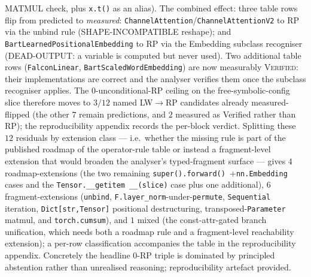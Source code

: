 \textsc{MATMUL} check, plus \texttt{x.t()} as an alias).
The combined effect: three table rows flip from predicted to
\emph{measured}:
\texttt{ChannelAttention}/\texttt{ChannelAttentionV2} to RP via the unbind
rule (SHAPE-INCOMPATIBLE reshape); and
\texttt{BartLearnedPositionalEmbedding} to RP via the Embedding subclass
recogniser (DEAD-OUTPUT: a variable is computed but never used).
Two additional table rows (\texttt{FalconLinear}, \texttt{BartScaledWordEmbedding})
are now measurably \textsc{Verified}: their implementations are correct and the
analyser verifies them once the subclass recogniser applies.
The $0$-unconditional-RP ceiling on the free-symbolic-config slice
therefore moves to $3/12$ named LW$\to$RP candidates already
measured-flipped (the other $7$ remain predictions, and $2$
measured as Verified rather than RP); the
reproducibility appendix records the per-block verdict.
Splitting these $12$ residuals by extension class --- i.e.\
whether the missing rule is part of the published roadmap of
the operator-rule table or instead a fragment-level extension
that would broaden the analyser's typed-fragment surface ---
gives $4$ roadmap-extensions (the two remaining \texttt{super().forward()
}+\texttt{nn.Embedding} cases and the \texttt{Tensor.\_\_getitem
\_\_(slice)} case plus one additional), $6$ fragment-extensions
(\texttt{unbind}, \texttt{F.layer\_norm}-under-\texttt{permute},
\texttt{Sequential} iteration,
\texttt{Dict[str,Tensor]} positional destructuring,
transposed-\texttt{Parameter} matmul, and \texttt{torch.cumsum}),
and $1$ mixed (the const-attr-gated branch unification, which
needs both a roadmap rule and a fragment-level reachability
extension); a per-row classification accompanies the table in
the reproducibility appendix.
Concretely the headline
$0$-RP triple is dominated by principled abstention rather than
unrealised reasoning; reproducibility artefact provided.

